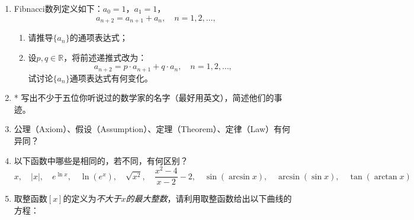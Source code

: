 \begin{enumerate}
  \item Fibnacci数列定义如下：$a_0=1$，$a_1=1$，
  $$a_{n+2}=a_{n+1}+a_{n},\quad n=1,2,\ldots,$$
  \begin{enumerate}[(1)]
    \item 请推导$\{a_n\}$的通项表达式；
    \item 设$p,q\in\mathbb{R}$，将前述递推式改为：
    $$a_{n+2}=p\cdot a_{n+1}+q\cdot a_{n},\quad n=1,2,\ldots,$$
    试讨论$\{a_n\}$通项表达式有何变化。
  \end{enumerate}
  \item* 写出不少于五位你听说过的数学家的名字（最好用英文），简述他们的事迹。
  \item 公理（Axiom）、假设（Assumption）、定理（Theorem）、定律（Law）有何异同？
  \item 以下函数中哪些是相同的，若不同，有何区别？
  $$x,\quad |x|,\quad e^{\ln x},\quad \ln(e^x),\quad \sqrt{x^2},\quad
	\frac{x^2-4}{x-2}-2,\quad
  \sin(\arcsin x),\quad \arcsin(\sin x), \quad \tan(\arctan x)$$
  \item 取整函数$[x]$的定义为{\it 不大于$x$的最大整数}，请利用取整函数给出以下曲线的方程：
  \begin{center}
	\\
	\\
  \end{center}

\end{enumerate}
